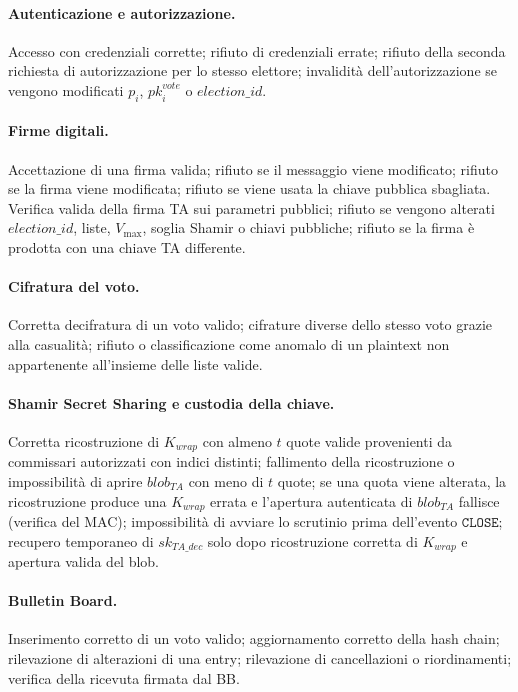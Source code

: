 \documentclass[12pt,a4paper]{article}
\newcommand{\pk}{\mathit{pk}}
\newcommand{\sk}{\mathit{sk}}
\begin{document}
\paragraph{Autenticazione e autorizzazione.}
Accesso con credenziali corrette; rifiuto di credenziali errate; rifiuto della seconda richiesta di autorizzazione per lo stesso elettore; invalidit\`a dell'autorizzazione se vengono modificati $p_i$, $\pk_i^{\mathit{vote}}$ o $\mathit{election\_id}$.

\paragraph{Firme digitali.}
Accettazione di una firma valida; rifiuto se il messaggio viene modificato; rifiuto se la firma viene modificata; rifiuto se viene usata la chiave pubblica sbagliata. Verifica valida della firma TA sui parametri pubblici; rifiuto se vengono alterati $\mathit{election\_id}$, liste, $V_{\max}$, soglia Shamir o chiavi pubbliche; rifiuto se la firma \`e prodotta con una chiave TA differente.

\paragraph{Cifratura del voto.}
Corretta decifratura di un voto valido; cifrature diverse dello stesso voto grazie alla casualit\`a; rifiuto o classificazione come anomalo di un plaintext non appartenente all'insieme delle liste valide.

\paragraph{Shamir Secret Sharing e custodia della chiave.}
Corretta ricostruzione di $K_{\mathit{wrap}}$ con almeno $t$ quote valide provenienti da commissari autorizzati con indici distinti; fallimento della ricostruzione o impossibilit\`a di aprire $\mathit{blob}_{\mathit{TA}}$ con meno di $t$ quote; se una quota viene alterata, la ricostruzione produce una $K_{\mathit{wrap}}$ errata e l'apertura autenticata di $\mathit{blob}_{\mathit{TA}}$ fallisce (verifica del MAC); impossibilit\`a di avviare lo scrutinio prima dell'evento $\texttt{CLOSE}$; recupero temporaneo di $\sk_{\mathit{TA\_dec}}$ solo dopo ricostruzione corretta di $K_{\mathit{wrap}}$ e apertura valida del blob.

\paragraph{Bulletin Board.}
Inserimento corretto di un voto valido; aggiornamento corretto della hash chain; rilevazione di alterazioni di una entry; rilevazione di cancellazioni o riordinamenti; verifica della ricevuta firmata dal BB.
\end{document}
